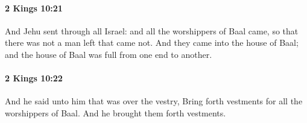 		\paragraph{2 Kings 10:21} %
			\label{2KINGS-10-21}

			And Jehu sent through all Israel: and all the worshippers of Baal came, so that there was not a man left that came not. And they came into the house of Baal; and the house of Baal was full from one end to another.


		\paragraph{2 Kings 10:22} %
			\label{2KINGS-10-22}

			And he said unto him that was over the vestry, Bring forth vestments for all the worshippers of Baal. And he brought them forth vestments.


